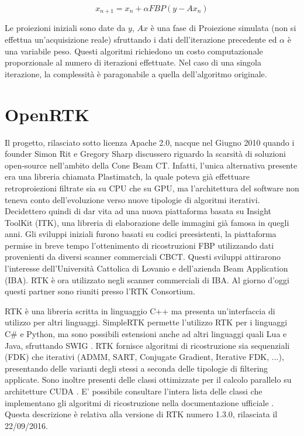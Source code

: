\documentclass[a4paper,12pt, doubleside]{report}
\begin{document}
                   \begin{equation}
                        x_{n+1} = x_n + \alpha FBP( y - Ax_n)
                    \end{equation}
                    
                    Le proiezioni iniziali sono date da $y$, $Ax$ è una fase di Proiezione simulata (non si effettua un'acquisizione reale) sfruttando i dati dell'iterazione precedente ed $\alpha$ è una variabile peso. Questi algoritmi richiedono un costo computazionale proporzionale al numero di iterazioni effettuate. Nel caso di una singola iterazione, la complessità è paragonabile a quella dell'algoritmo originale.
                    
        \section{OpenRTK}
            \label{sec:openrtk}
            \par
                Il progetto, rilasciato sotto licenza Apache 2.0, nacque nel Giugno 2010 quando i founder Simon Rit e Gregory Sharp discussero riguardo la scarsità di soluzioni open-source nell'ambito della Cone Beam CT. Infatti, l'unica alternativa presente era una libreria chiamata Plastimatch, la quale poteva già effettuare retroproiezioni filtrate sia su CPU che su GPU, ma l'architettura del software non teneva conto dell'evoluzione verso nuove tipologie di algoritmi iterativi. Decidettero quindi di dar vita ad una nuova piattaforma basata su Insight ToolKit (ITK), una libreria di elaborazione delle immagini già famosa in quegli anni. Gli sviluppi iniziali furono basati su codici preesistenti, la piattaforma permise in breve tempo l'ottenimento di ricostruzioni FBP utilizzando dati provenienti da diversi scanner commerciali CBCT. Questi sviluppi attirarono l'interesse dell'Università Cattolica di Lovanio e dell'azienda Beam Application (IBA). RTK è ora utilizzato negli scanner commerciali di IBA. Al giorno d'oggi questi partner sono riuniti presso l'RTK Consortium.
            
            \bigskip
            \par
                RTK è una libreria scritta in linguaggio C++ ma presenta un'interfaccia di utilizzo per altri linguaggi. SimpleRTK \cite{simplertk-wiki} permette l'utilizzo RTK per i linguaggi C\# e Python, ma sono possibili estensioni anche ad altri linguaggi quali Lua e Java, sfruttando SWIG \cite{swig-website}.  RTK fornisce algoritmi di ricostruzione sia sequenziali (FDK) che iterativi (ADMM, SART, Conjugate Gradient, Iterative FDK, ...), presentando delle varianti degli stessi a seconda delle tipologie di filtering applicate. Sono inoltre presenti delle classi ottimizzate per il calcolo parallelo su architetture CUDA \cite{cuda}. E' possibile consultare l'intera lista delle classi che implementano gli algoritmi di ricostruzione nella documentazione ufficiale \cite{rtk-classi}. 
                Questa descrizione è relativa alla versione di RTK numero 1.3.0, rilasciata il 22/09/2016.
                    
\end{document}
